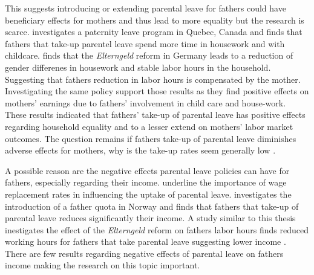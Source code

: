 This suggests introducing or extending parental leave for fathers could have beneficiary effects for mothers and thus lead to more equality but the research is scarce.
\citet{patnaikReservingTimeDaddy2019} investigates a paternity leave program in Quebec, Canada and finds that fathers that take-up parentel leave spend more time in housework and with childcare.
\citet{tammFathersParentalLeaveTaking2018} finds that the \textit{Elterngeld} reform in Germany leads to a reduction of gender differenes in housework and stable labor hours in the household.
Suggesting that fathers reduction in labor hours is compensated by the mother.
Investigating the same policy \citet{frodermannParentalLeavePolicy2023} support those results as they find positive effects on mothers' earnings due to fathers' involvement in child care and house-work.
These results indicated that fathers' take-up of parental leave has positive effects regarding household equality and to a lesser extend on mothers' labor market outcomes.
The question remains if fathers take-up of parental leave diminishes adverse effects for mothers, why is
the take-up rates seem generally low \citep[see][]{laliveParentalLeaveMothers2014, frodermannParentalLeavePolicy2023}.

A possible reason are the negative effects parental leave policies can have for fathers, especially regarding their income.
\citet{jorgensenWelfareReformsDivision2021} underline the importance of wage replacement rates in influencing the uptake of parental leave.
\citet{regeImpactPaternityLeave2013} investigates the introduction of a father quota in Norway and finds that fathers that take-up of parental leave reduces significantly their income.
A study similar to this thesis inestigates the effect of the \textit{Elterngeld} reform on fathers labor hours finds reduced working hours for fathers that take parental leave suggesting lower income \citep{bunningWhatHappensDaddy2015}.
There are few results regarding negative effects of parental leave on fathers income making the research on this topic important.
